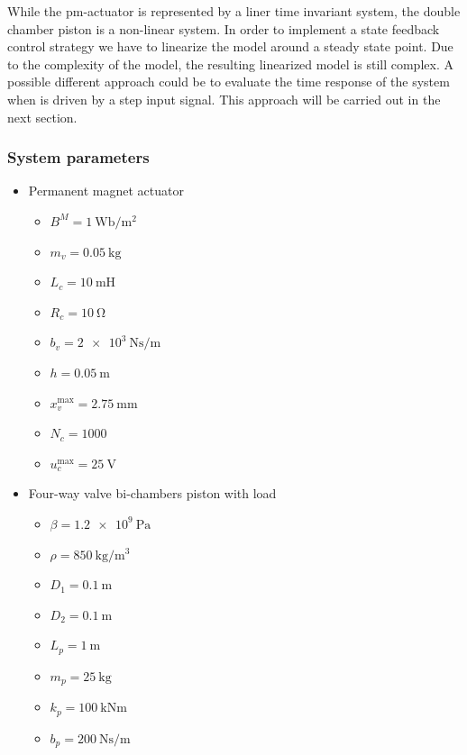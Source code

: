 \documentclass[12pt,a4paper,oneside]{book}
\begin{document}
\begin{onehalfspace}
While the pm-actuator is represented by a liner time invariant system, the double chamber piston is a non-linear system. In order to implement a state feedback control strategy we have to linearize the model around a steady state point. Due to the complexity of the model, the resulting linearized model is still complex. A possible different approach could be to evaluate the time response of the system when is driven by a step input signal. This approach will be carried out in the next section.  

\subsubsection{System parameters}
\begin{itemize}
	\item Permanent magnet actuator
	\begin{itemize}
		\item $B^M = \SI{1}{\weber\per\square\meter}$
		\item $m_v = \SI{0.05}{\kilogram}$
		\item $L_c = \SI{10}{\milli\henry}$
		\item $R_c = \SI{10}{\ohm}$
		\item $b_v = \SI{2e3}{\newton\second\per\meter}$
		\item $h = \SI{0.05}{\meter}$
		\item $x_v^{\text{max}} = \SI{2.75}{\milli\meter}$
		\item $N_c = \SI{1000}{}$		
		\item $u_c^{\text{max}} = \SI{25}{\volt}$
	\end{itemize}
	\item Four-way valve bi-chambers piston with load
	\begin{itemize}
		\item $\beta = \SI{1.2e9}{\pascal}$
		\item $\rho = \SI{850}{\kilogram\per\cubic\meter}$
		\item $D_1 = \SI{0.1}{\meter}$
		\item $D_2 = \SI{0.1}{\meter}$
		\item $L_p = \SI{1}{\meter}$
		\item $m_p = \SI{25}{\kilogram}$
		\item $k_p = \SI{100}{\kilo\newton\meter}$
		\item $b_p = \SI{200}{\newton\second\per\meter}$
	\end{itemize}
\end{itemize}


\end{onehalfspace}
\end{document}

